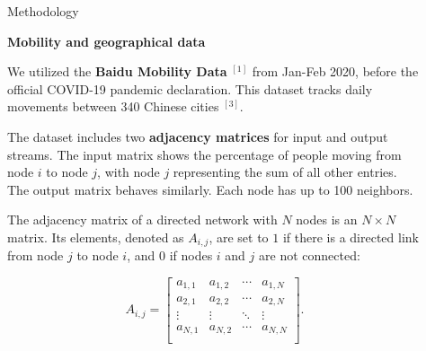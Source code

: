 \documentclass{beamer} %
\begin{document}
\begin{frame}[t]
\begin{columns}[t]
\begin{column}{0.465\textwidth}
\end{column}

\begin{column}{0.03\textwidth}\end{column} %
 
\begin{column}{0.465\textwidth} %


\begin{block}{Methodology}
    
    \textbf{Mobility and geographical data}

    We utilized the \textbf{Baidu Mobility Data} $^{[1]}$ from Jan-Feb 2020, before the official COVID-19 pandemic declaration. This dataset tracks daily movements between 340 Chinese cities $^{[3]}$.

    \bigskip
    
    The dataset includes two \textbf{adjacency matrices} for input and output streams. The input matrix shows the percentage of people moving from node $i$ to node $j$, with node $j$ representing the sum of all other entries. The output matrix behaves similarly. Each node has up to 100 neighbors.

    \bigskip
    
    The adjacency matrix of a directed network with $N$ nodes is an $N \times N$ matrix. Its elements, denoted as $A_{i,j}$, are set to $1$ if there is a directed link from node $j$ to node $i$, and $0$ if nodes $i$ and $j$ are not connected:

    \begin{center}
    \begin{equation}
    A_{i, j} = \begin{bmatrix}
    a_{1, 1} & a_{1, 2} & \cdots & a_{1, N} \\
    a_{2, 1} & a_{2, 2} & \cdots & a_{2, N} \\
    \vdots & \vdots & \ddots & \vdots \\
    a_{N, 1} & a_{N, 2} & \cdots & a_{N, N} \\
    \end{bmatrix}.
    \end{equation}
    \end{center}


\end{block}
\end{column}
\end{columns}
\end{frame}
\end{document}
